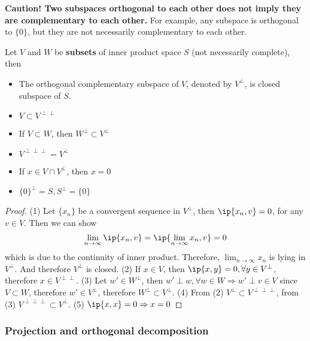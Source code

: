 \begin{refsection}
\begin{remark}
\textbf{Caution! Two subspaces orthogonal to each other does not imply they are complementary to each other.} For example, any subspace is orthogonal to $\{0\}$, but they are not necessarily complementary to each other. 
\end{remark}

\begin{theorem}\label{ch:functional-analysis:th:OrthogonalityRelationInInnerProductSpace}
\cite[108]{moon2000mathematical}
Let $V$ and $W$ be \textbf{subsets} of inner product space $S$ (not necessarily complete), then 
\begin{itemize}
    \item The orthogonal complementary subspace of $V$, denoted by $V^{\perp}$, is closed subspace of $S$.
    \item $V\subset V^{\perp\perp}$
    \item If $V\subset W$, then $W^{\perp} \subset V^{\perp}$
    \item $V^{\perp\perp\perp} = V^{\perp}$
    \item If $x\in V \cap V^{\perp}$, then $x = 0$
    \item $\{0\}^{\perp} = S,S^{\perp} = \{0\}$
\end{itemize}
\end{theorem}
\begin{proof}
(1) Let $\{x_n\}$ be a convergent sequence in $V^\perp$, then $\ip{x_n,v} = 0$, for any $v\in V$. Then we can show $$\lim_{n\to \infty} \ip{x_n,v} = \ip{\lim_{n\to \infty}x_n,v} = 0$$ which is due to the continuity of inner product. Therefore, $\lim_{n\to \infty}x_n$ is lying in $V^\perp$. And therefore $V^\perp$ is closed. (2) If $x\in V$, then $\ip{x,y} = 0, \forall y\in V^\perp$, therefore $x\in V^{\perp\perp}$. (3) Let $w' \in W^\perp$, then $w'\perp w,\forall w \in W \Rightarrow w'\perp v\in V$ since $V\subset W$, therefore $w'\in V^\perp$, therefore $W^\perp \subset V^\perp$. (4) From (2) $V^\perp \subset V^{\perp\perp\perp}$, from (3)  $  V^{\perp\perp\perp}\subset V^\perp$. (5) $\ip{x,x} = 0\Rightarrow x = 0$
\end{proof}



\subsubsection{Projection and orthogonal decomposition}


\end{refsection}
